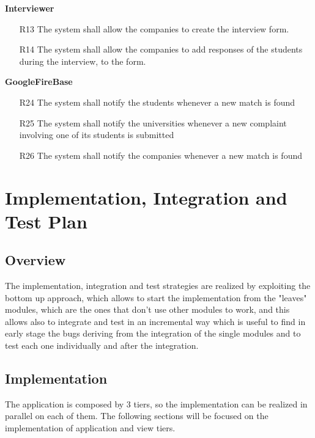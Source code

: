 \documentclass{article}
\begin{document}
\textbf{Interviewer}
\begin{itemize}
    \item [R13] The system shall allow the companies to create the interview form.
    \item [R14] The system shall allow the companies to add responses of the students during the interview, to the form.
\end{itemize}

\textbf{GoogleFireBase}
\begin{itemize}
    \item [R24] The system shall notify the students whenever a new match is found
    \item [R25] The system shall notify the universities whenever a new complaint involving one of its students is submitted
    \item [R26]The system shall notify the companies whenever a new match is found
\end{itemize}

\section{Implementation, Integration and Test Plan}

\subsection{Overview}
The implementation, integration and test strategies are realized by exploiting the bottom up approach, which allows to start the implementation from the "leaves" modules, which are the ones that don't use other modules to work, and this allows also to integrate and test in an incremental way which is useful to find in early stage the bugs deriving from the integration of the single modules and to test each one individually and after the integration.

\subsection{Implementation}
The application is composed by 3 tiers, so the implementation can be realized in parallel on each of them.  The following sections will be focused on the implementation of application and view tiers.
\end{document}
